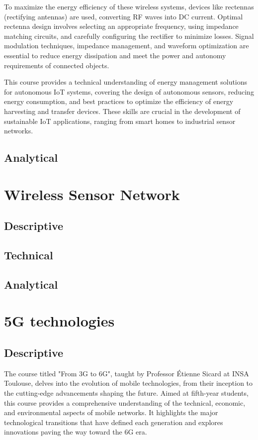To maximize the energy efficiency of these wireless systems, devices like rectennas (rectifying antennas) are used, converting RF waves into DC current. Optimal rectenna design involves selecting an appropriate frequency, using impedance matching circuits, and carefully configuring the rectifier to minimize losses. Signal modulation techniques, impedance management, and waveform optimization are essential to reduce energy dissipation and meet the power and autonomy requirements of connected objects.

This course provides a technical understanding of energy management solutions for autonomous IoT systems, covering the design of autonomous sensors, reducing energy consumption, and best practices to optimize the efficiency of energy harvesting and transfer devices. These skills are crucial in the development of sustainable IoT applications, ranging from smart homes to industrial sensor networks.


\subsection{Analytical}

\section{Wireless Sensor Network}

\subsection{Descriptive}
\subsection{Technical}
\subsection{Analytical}

\section{5G technologies}

\subsection{Descriptive}

The course titled "From 3G to 6G", taught by Professor Étienne Sicard at INSA Toulouse, delves into the evolution of mobile technologies, from their inception to the cutting-edge advancements shaping the future. Aimed at fifth-year students, this course provides a comprehensive understanding of the technical, economic, and environmental aspects of mobile networks. It highlights the major technological transitions that have defined each generation and explores innovations paving the way toward the 6G era.

